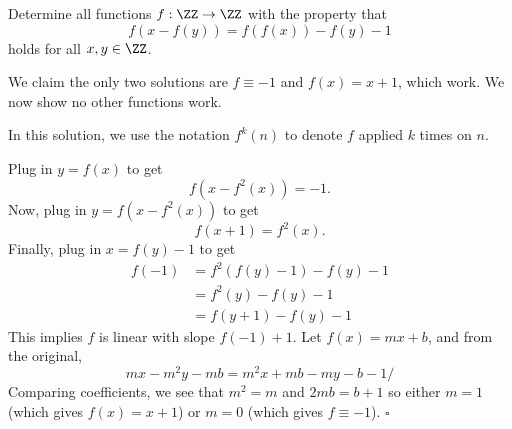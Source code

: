 
\begin{problem}[ISL 2015 A2]
    Determine all functions $f : \ZZ \to \ZZ$ with the property that
    \[f(x-f(y))=f(f(x))-f(y)-1\] holds for all $x,y \in \ZZ$.
\end{problem}

\begin{solution}[Ritwin]
    We claim the only two solutions are $f \equiv -1$ and $f(x) = x+1$,
    which work. We now show no other functions work.
    
    In this solution, we use the notation $f^k(n)$ to denote $f$ applied $k$ times on $n$.
    
    Plug in $y = f(x)$ to get \[f(x - f^2(x)) = -1.\]
    Now, plug in $y = f(x - f^2(x))$ to get \[f(x+1) = f^2(x).\]
    Finally, plug in $x = f(y)-1$ to get \begin{align*}
        f(-1) &= f^2(f(y)-1) - f(y) - 1\\
              &= f^2(y) - f(y) - 1\\
              &= f(y+1) - f(y) - 1
    \end{align*}
    This implies $f$ is linear with slope $f(-1) + 1$. Let $f(x) = mx + b$, and
    from the original, \[mx - m^2y - mb = m^2x + mb - my - b - 1/\]
    Comparing coefficients, we see that $m^2 = m$ and $2mb = b+1$ so either $m=1$
    (which gives $f(x) = x+1$) or $m = 0$ (which gives $f \equiv -1$). $\square$
\end{solution}
